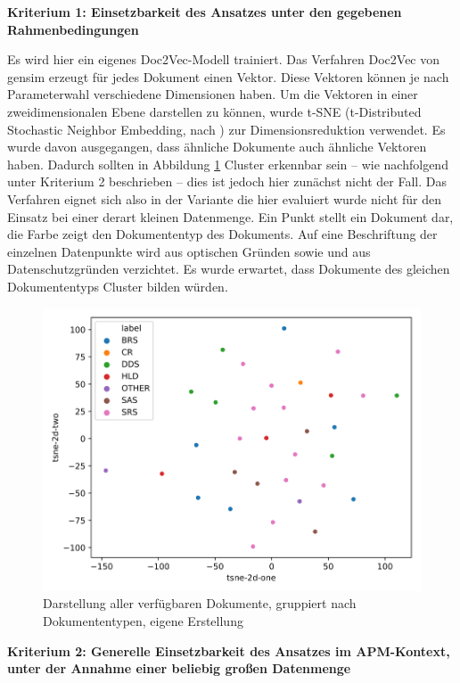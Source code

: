 {\bf Kriterium 1: Einsetzbarkeit des Ansatzes unter den gegebenen Rahmenbedingungen}

Es wird hier ein eigenes Doc2Vec-Modell trainiert. Das Verfahren Doc2Vec von gensim erzeugt für jedes Dokument einen Vektor. Diese Vektoren können je nach Parameterwahl verschiedene Dimensionen haben. Um die Vektoren in einer zweidimensionalen Ebene darstellen zu können, wurde t-SNE (t-Distributed Stochastic Neighbor Embedding, nach \cite{t-SNE}) zur Dimensionsreduktion verwendet. Es wurde davon ausgegangen, dass ähnliche Dokumente auch ähnliche Vektoren haben. Dadurch sollten in Abbildung \ref{Abbildung:doc2vec1} Cluster erkennbar sein – wie nachfolgend unter Kriterium 2 beschrieben – dies ist jedoch hier zunächst nicht der Fall. Das Verfahren eignet sich also in der Variante die hier evaluiert wurde nicht für den Einsatz bei einer derart kleinen Datenmenge. Ein Punkt stellt ein Dokument dar, die Farbe zeigt den Dokumententyp des Dokuments. Auf eine Beschriftung der einzelnen Datenpunkte wird aus optischen Gründen sowie und aus Datenschutzgründen verzichtet. Es wurde erwartet, dass Dokumente des gleichen Dokumententyps Cluster bilden würden.

\begin{figure}[h]
\centering
\includegraphics[scale=0.95]{content/pics/Picture_14.png}
\caption{Darstellung aller verfügbaren Dokumente, gruppiert nach Dokumententypen, eigene Erstellung}
\label{Abbildung:doc2vec1}
\end{figure}

{\bf Kriterium 2: Generelle Einsetzbarkeit des Ansatzes im APM-Kontext, unter der Annahme einer beliebig großen Datenmenge}

